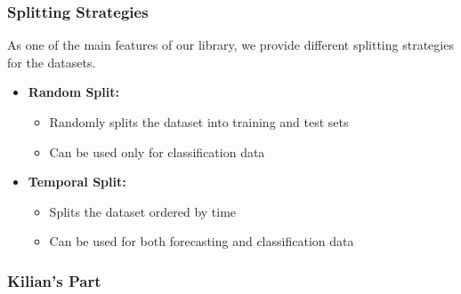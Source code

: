 \documentclass[t,english]{beamer}
\begin{document}
\begin{frame}
  \frametitle{Splitting Strategies}
  As one of the main features of our library, we provide different splitting strategies for the datasets.
  \begin{itemize}[]
    \item \textbf{Random Split:}
    \begin{itemize}
      \item Randomly splits the dataset into training and test sets
      \item Can be used only for classification data
    \end{itemize}
    \item \textbf{Temporal Split:}
    \begin{itemize}
      \item Splits the dataset ordered by time
      \item Can be used for both forecasting and classification data
    \end{itemize}
  \end{itemize}

\end{frame}

\begin{frame}
  \frametitle{Kilian's Part}
    
\end{frame}
\end{document}
